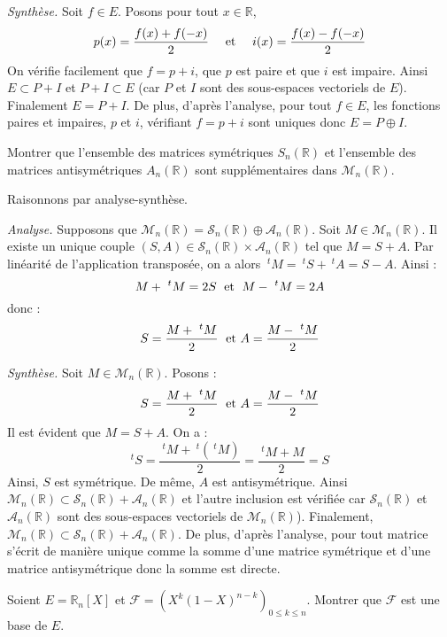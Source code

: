 \documentclass[a4paper,twoside,french,11pt]{VcCours}
\begin{document}
\medskip

\textit{Synthèse.} Soit $f \in E$. Posons pour tout $x \in \mathbb{R}$,
$$ p(x) = \frac{f(x)+f(-x)}{2} \quad \hbox{ et } \quad i(x) = \frac{f(x)-f(-x)}{2} $$
On vérifie facilement que $f=p+i$, que $p$ est paire et que $i$ est impaire. Ainsi $E \subset P + I$ et $P + I \subset E$ (car $P$ et $I$ sont des sous-espaces vectoriels de $E$). Finalement $E=P+I$. De plus, d'après l'analyse, pour tout $f \in E$, les fonctions paires et impaires, $p$ et $i$, vérifiant $f=p+i$ sont uniques donc $E = P \oplus I$.


\begin{Exercice}{} Montrer que l'ensemble des matrices symétriques $S_n(\mathbb{R})$ et l'ensemble des matrices antisymétriques $A_n(\mathbb{R})$ sont supplémentaires dans $\mathcal{M}_n(\mathbb{R})$.
\end{Exercice}

\corr Raisonnons par analyse-synthèse.

\medskip

\textit{Analyse.} Supposons que $\mathcal{M}_n(\mathbb{R})= \mathcal{S}_n(\mathbb{R}) \oplus \mathcal{A}_n(\mathbb{R})$. Soit $M \in \mathcal{M}_n(\mathbb{R})$. Il existe un unique couple $(S,A) \in \mathcal{S}_n(\mathbb{R}) \times \mathcal{A}_n(\mathbb{R})$ tel que $M=S+A$. Par linéarité de l'application transposée, on a alors $~^t M = ~^t S + ~^t A = S-A$. Ainsi :
$$ M + ~^t M = 2S \; \hbox{ et } \; M- ~^tM= 2A$$
donc :
$$ S = \dfrac{M + ~^t M}{2} \; \hbox{ et } A = \dfrac{M-~^tM}{2}$$

\medskip

\textit{Synthèse.} Soit $M \in \mathcal{M}_n(\mathbb{R})$. Posons : 
$$ S = \dfrac{M + ~^t M}{2} \; \hbox{ et } A = \dfrac{M-~^tM}{2}$$
Il est évident que $M=S+A$. On a :
$$ ^t{} S = \dfrac{~^t M + ~^t(~^t M)}{2} = \dfrac{~^t M + M}{2} = S$$
Ainsi, $S$ est symétrique. De même, $A$ est antisymétrique.
 Ainsi $\mathcal{M}_n(\mathbb{R}) \subset \mathcal{S}_n(\mathbb{R}) + \mathcal{A}_n(\mathbb{R})$ et l'autre inclusion est vérifiée car $\mathcal{S}_n(\mathbb{R})$ et $\mathcal{A}_n(\mathbb{R})$ sont des sous-espaces vectoriels de $\mathcal{M}_n(\mathbb{R})$). Finalement, $\mathcal{M}_n(\mathbb{R}) \subset \mathcal{S}_n(\mathbb{R}) + \mathcal{A}_n(\mathbb{R})$. De plus, d'après l'analyse, pour tout matrice s'écrit de manière unique comme la somme d'une matrice symétrique et d'une matrice antisymétrique donc la somme est directe.

\begin{Exercice}{} Soient $E= \mathbb{R}_n[X]$ et $\mathcal{F} = (X^k(1-X)^{n-k})_{0 \leq k \leq n}$. Montrer que $\mathcal{F}$ est une base de $E$.
\end{Exercice}
\end{document}
